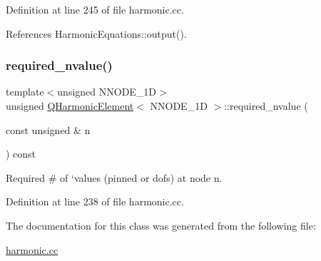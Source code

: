 Definition at line 245 of file harmonic.\+cc.



References Harmonic\+Equations\+::output().

\mbox{\label{classQHarmonicElement_a8574a452983b15fb2b4d40ec4ef3e890}} 
\subsubsection{\texorpdfstring{required\+\_\+nvalue()}{required\_nvalue()}}
{\footnotesize\ttfamily template$<$unsigned N\+N\+O\+D\+E\+\_\+1D$>$ \\
unsigned \hyperlink{classQHarmonicElement}{Q\+Harmonic\+Element}$<$ N\+N\+O\+D\+E\+\_\+1D $>$\+::required\+\_\+nvalue (\begin{DoxyParamCaption}\item[{const unsigned \&}]{n }\end{DoxyParamCaption}) const\hspace{0.3cm}{\ttfamily [inline]}}



Required \# of `values\textquotesingle{} (pinned or dofs) at node n. 



Definition at line 238 of file harmonic.\+cc.



The documentation for this class was generated from the following file\+:\begin{DoxyCompactItemize}
\item 
\hyperlink{harmonic_8cc}{harmonic.\+cc}\end{DoxyCompactItemize}
